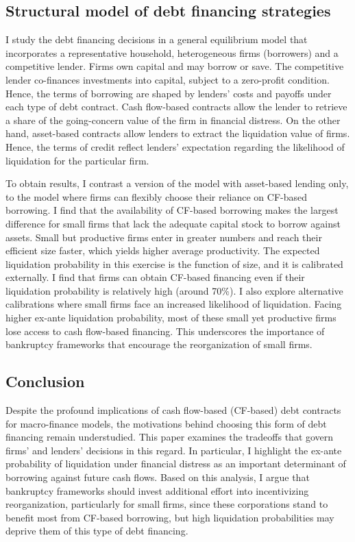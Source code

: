 \documentclass[12pt]{article}
\begin{document}
\subsection*{Structural model of debt financing strategies}
I study the debt financing decisions in a general equilibrium model that incorporates a representative household, heterogeneous firms (borrowers) and a competitive lender. Firms own capital and may borrow or save. The competitive lender co-finances investments into capital, subject to a zero-profit condition. Hence, the terms of borrowing are shaped by lenders' costs and payoffs under each type of debt contract. Cash flow-based contracts allow the lender to retrieve a share of the going-concern value of the firm in financial distress. On the other hand, asset-based contracts allow lenders to extract the liquidation value of firms. Hence, the terms of credit reflect lenders' expectation regarding the likelihood of liquidation for the particular firm.

To obtain results, I contrast a version of the model with asset-based lending only, to the model where firms can flexibly choose their reliance on CF-based borrowing. I find that the availability of CF-based borrowing makes the largest difference for small firms that lack the adequate capital stock to borrow against assets. Small but productive firms enter in greater numbers and reach their efficient size faster, which yields higher average productivity. The expected liquidation probability in this exercise is the function of size, and it is calibrated externally. I find that firms can obtain CF-based financing even if their liquidation probability is relatively high (around 70\%). I also explore alternative calibrations where small firms face an increased likelihood of liquidation. Facing higher ex-ante liquidation probability, most of these small yet productive firms lose access to cash flow-based financing. This underscores the importance of bankruptcy frameworks that encourage the reorganization of small firms.


\subsection*{Conclusion}

Despite the profound implications of cash flow-based (CF-based) debt contracts for macro-finance models, the motivations behind choosing this form of debt financing remain understudied. This paper examines the tradeoffs that govern firms' and lenders' decisions in this regard. In particular, I highlight the ex-ante probability of liquidation under financial distress as an important determinant of borrowing against future cash flows. Based on this analysis, I argue that bankruptcy frameworks should invest additional effort into incentivizing reorganization, particularly for small firms, since these corporations stand to benefit most from CF-based borrowing, but high liquidation probabilities may deprive them of this type of debt financing.
\end{document}
